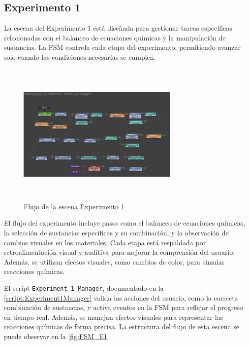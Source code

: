 \subsection{Experimento 1}
La escena del Experimento 1 está diseñada para gestionar tareas específicas relacionadas con el balanceo de ecuaciones químicas y la manipulación de sustancias. La FSM controla cada etapa del experimento, permitiendo avanzar solo cuando las condiciones necesarias se cumplen.
\begin{figure}[thbp]
    \centering
    \includegraphics[width=0.7\textwidth, height = 7cm]{img/chapter05/Experimento_01.png}
    \caption{Flujo de la escena Experimento 1}
    \label{fig:FSM_E1}
\end{figure}

El flujo del experimento incluye pasos como el balanceo de ecuaciones químicas, la selección de sustancias específicas y su combinación, y la observación de cambios visuales en los materiales. Cada etapa está respaldada por retroalimentación visual y auditiva para mejorar la comprensión del usuario. Además, se utilizan efectos visuales, como cambios de color, para simular reacciones químicas.

El script \texttt{Experiment\_1\_Manager}, documentado en la \autoref{script:Experiment1Manager} valida las acciones del usuario, como la correcta combinación de sustancias, y activa eventos en la FSM para reflejar el progreso en tiempo real. Además, se manejan efectos visuales para representar las reacciones químicas de forma precisa. La estructura del flujo de esta escena se puede observar en la \autoref{fig:FSM_E1}.

